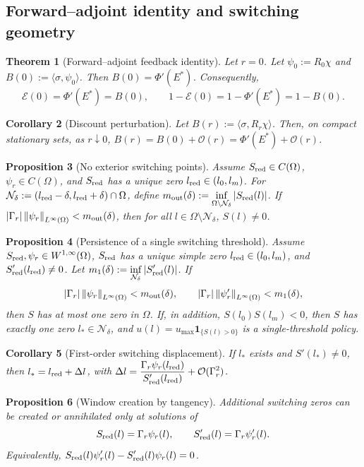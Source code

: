 \documentclass[pdflatex,sn-mathphys-num]{sn-jnl}
\theoremstyle{thmstyleone}
\newtheorem{theorem}{Theorem}[section]
\newtheorem{proposition}[theorem]{Proposition}
\newtheorem{corollary}[theorem]{Corollary}
\theoremstyle{definition}
\theoremstyle{remark}
\newcommand{\Om}{\Omega}
\newcommand{\Ev}{\mathcal{E}}
\newcommand{\norm}[1]{\left\lVert#1\right\rVert}
\newcommand{\abs}[1]{\left\lvert#1\right\rvert}
\numberwithin{equation}{section}
\begin{document}
\subsection{Forward--adjoint identity and switching geometry}
\label{subsec:main-identity-switching}
\begin{theorem}[Forward--adjoint feedback identity]
\label{thm:main-identity}
Let \(r=0\). Let
$\psi_0:=R_0\chi$ and
$B(0):=\langle\sigma,\psi_0\rangle$.
Then
$\displaystyle 
B(0)=\Phi'(E^*)$.
Consequently,
\[
\Ev(0)=\Phi'(E^*)=B(0),
\qquad
1-\Ev(0)=1-\Phi'(E^*)=1-B(0).
\]
\end{theorem}
\begin{corollary}[Discount perturbation]
\label{cor:main-discount}
Let
$\displaystyle 
B(r):=\langle\sigma,R_r\chi\rangle$.
Then, on compact stationary sets, as $r\downarrow0$,
$\displaystyle 
B(r)=B(0)+\mathcal O(r) = \Phi'(E^*)+\mathcal O(r)$.
\end{corollary}
\begin{proposition}[No exterior switching points]
\label{prop:main-no-exterior}
Assume
$S_{\rm red}\in C(\Om)$,
$\psi_r\in C(\Om)$,
and \(S_{\rm red}\) has a unique zero \(l_{\rm red}\in(l_0,l_m)\). For
$\displaystyle 
\mathcal N_\delta:=(l_{\rm red}-\delta,l_{\rm red}+\delta)\cap\Om$,
define
$\displaystyle 
m_{\rm out}(\delta):=
\inf_{\Om\setminus\mathcal N_\delta}\abs{S_{\rm red}(l)}$.
If
$\displaystyle 
\abs{\Gamma_r}\norm{\psi_r}_{L^\infty(\Om)}
<
m_{\rm out}(\delta)$,
then for all $l\in\Om\setminus\mathcal N_\delta$,
$S(l)\ne0$.
\end{proposition}
\begin{proposition}[Persistence of a single switching threshold]
\label{prop:main-single-threshold}
Assume
$\displaystyle 
S_{\rm red},\psi_r\in W^{1,\infty}(\Om)$,
\(S_{\rm red}\) has a unique simple zero \(l_{\rm red}\in(l_0,l_m)\), and
$\displaystyle 
S_{\rm red}'(l_{\rm red})\ne0$.
Let
$\displaystyle 
m_1(\delta):=
\inf_{\mathcal N_\delta}\abs{S_{\rm red}'(l)}$.
If
\[
\abs{\Gamma_r}\norm{\psi_r}_{L^\infty(\Om)}
<
m_{\rm out}(\delta),
\qquad
\abs{\Gamma_r}\norm{\psi_r'}_{L^\infty(\Om)}
<
m_1(\delta),
\]
then \(S\) has at most one zero in \(\Om\). If, in addition,
$\displaystyle 
S(l_0)S(l_m)<0$,
then \(S\) has exactly one zero \(l_*\in\mathcal N_\delta\), and
$\displaystyle 
u(l)=u_{\max}\mathbf 1_{\{S(l)>0\}}$
is a single-threshold policy.
\end{proposition}
\begin{corollary}[First-order switching displacement]
\label{cor:main-switch-shift}
If \(l_*\) exists and \(S'(l_*)\ne0\), then
$\displaystyle 
l_*=
l_{\rm red}
+
\Delta l$,
with
$\displaystyle 
\Delta l
=
\frac{\Gamma_r\psi_r(l_{\rm red})}
     {S_{\rm red}'(l_{\rm red})} + \mathcal O(\Gamma_r^2)$.
\end{corollary}
\begin{proposition}[Window creation by tangency]
\label{prop:main-window}
Additional switching zeros can be created or annihilated only at solutions of
\[
S_{\rm red}(l)=\Gamma_r\psi_r(l),
\qquad
S_{\rm red}'(l)=\Gamma_r\psi_r'(l).
\]
Equivalently,
$\displaystyle 
S_{\rm red}(l)\psi_r'(l)-S_{\rm red}'(l)\psi_r(l)=0$.
\end{proposition}
\end{document}
